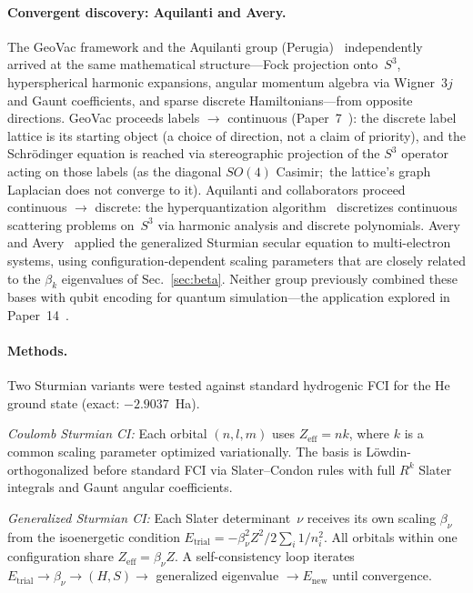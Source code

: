 \documentclass[aps,pra,twocolumn,superscriptaddress,longbibliography]{revtex4-2}
\theoremstyle{remark}
\theoremstyle{plain}
\begin{document}
\paragraph{Convergent discovery: Aquilanti and Avery.}
The GeoVac framework and the Aquilanti group
(Perugia)~\cite{Aquilanti1986,Aquilanti1990,Aquilanti2001} independently
arrived at the same mathematical structure---Fock projection onto~$S^3$,
hyperspherical harmonic expansions, angular momentum algebra via
Wigner~$3j$ and Gaunt coefficients, and sparse discrete
Hamiltonians---from opposite directions.  GeoVac proceeds labels $\to$
continuous (Paper~7~\cite{loutey_paper7}): the discrete label lattice
is its starting object (a choice of direction, not a claim of priority),
and the Schr\"odinger equation is reached via stereographic projection of
the $S^3$ operator acting on those labels
(as the diagonal $SO(4)$ Casimir;\ the lattice's graph Laplacian does not
converge to it).  Aquilanti and collaborators proceed continuous
$\to$ discrete: the hyperquantization
algorithm~\cite{DeFazio2003,AquilantiCapecchi2000} discretizes continuous
scattering problems on~$S^3$ via harmonic analysis and discrete
polynomials.  Avery and Avery~\cite{Avery2004} applied the generalized
Sturmian secular equation to multi-electron systems, using
configuration-dependent scaling parameters that are closely related to
the $\beta_k$ eigenvalues of Sec.~\ref{sec:beta}.  Neither group
previously combined these bases with qubit encoding for quantum
simulation---the application explored in
Paper~14~\cite{loutey_paper14}.

\paragraph{Methods.}
Two Sturmian variants were tested against standard hydrogenic FCI for
the He ground state (exact: $-2.9037$~Ha).

\emph{Coulomb Sturmian CI:} Each orbital $(n,l,m)$ uses
$Z_{\mathrm{eff}} = n k$, where $k$ is a common scaling parameter
optimized variationally.  The basis is L\"owdin-orthogonalized before
standard FCI via Slater--Condon rules with full $R^k$ Slater integrals
and Gaunt angular coefficients.

\emph{Generalized Sturmian CI:} Each Slater determinant~$\nu$ receives
its own scaling $\beta_\nu$ from the isoenergetic condition
$E_{\mathrm{trial}} = -\beta_\nu^2 Z^2 / 2 \sum_i 1/n_i^2$.
All orbitals within one configuration share
$Z_{\mathrm{eff}} = \beta_\nu Z$.  A self-consistency loop iterates
$E_{\mathrm{trial}} \to \beta_\nu \to (H, S) \to$ generalized
eigenvalue $\to E_{\mathrm{new}}$ until convergence.
\end{document}
